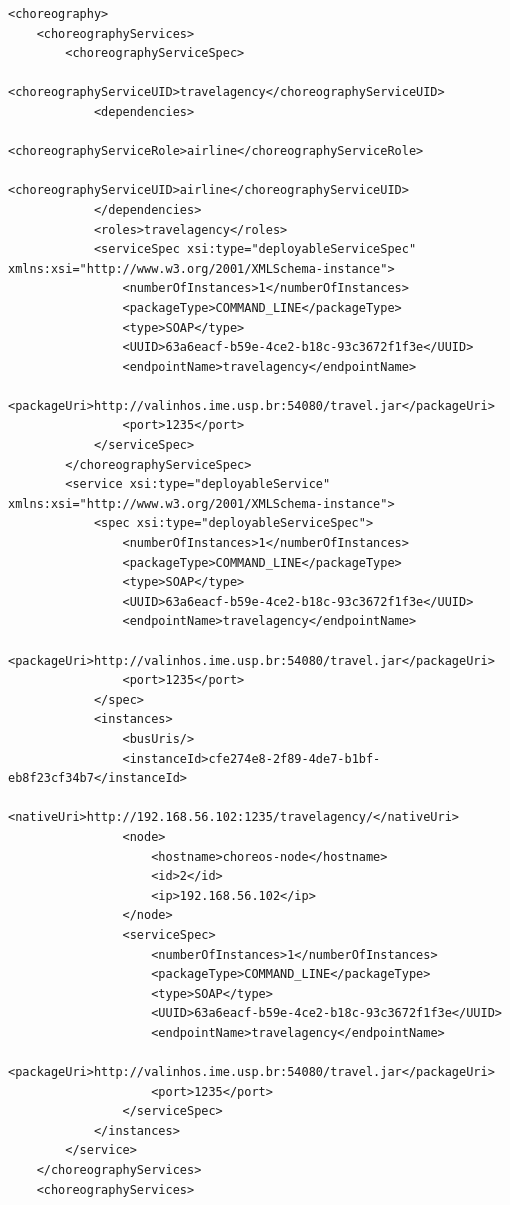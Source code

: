 \documentclass[a4paper, 10pt]{article}
\begin{document}
{\begin{lstlisting}[caption=Choreography XML representation example, label=lst:chor_xml]
<choreography>
    <choreographyServices>
        <choreographyServiceSpec>
            <choreographyServiceUID>travelagency</choreographyServiceUID>
            <dependencies>
                <choreographyServiceRole>airline</choreographyServiceRole>
                <choreographyServiceUID>airline</choreographyServiceUID>
            </dependencies>
            <roles>travelagency</roles>
            <serviceSpec xsi:type="deployableServiceSpec" 
xmlns:xsi="http://www.w3.org/2001/XMLSchema-instance">
                <numberOfInstances>1</numberOfInstances>
                <packageType>COMMAND_LINE</packageType>
                <type>SOAP</type>
                <UUID>63a6eacf-b59e-4ce2-b18c-93c3672f1f3e</UUID>
                <endpointName>travelagency</endpointName>
                <packageUri>http://valinhos.ime.usp.br:54080/travel.jar</packageUri>
                <port>1235</port>
            </serviceSpec>
        </choreographyServiceSpec>
        <service xsi:type="deployableService" 
xmlns:xsi="http://www.w3.org/2001/XMLSchema-instance">
            <spec xsi:type="deployableServiceSpec">
                <numberOfInstances>1</numberOfInstances>
                <packageType>COMMAND_LINE</packageType>
                <type>SOAP</type>
                <UUID>63a6eacf-b59e-4ce2-b18c-93c3672f1f3e</UUID>
                <endpointName>travelagency</endpointName>
                <packageUri>http://valinhos.ime.usp.br:54080/travel.jar</packageUri>
                <port>1235</port>
            </spec>
            <instances>
                <busUris/>
                <instanceId>cfe274e8-2f89-4de7-b1bf-eb8f23cf34b7</instanceId>
                <nativeUri>http://192.168.56.102:1235/travelagency/</nativeUri>
                <node>
                    <hostname>choreos-node</hostname>
                    <id>2</id>
                    <ip>192.168.56.102</ip>
                </node>
                <serviceSpec>
                    <numberOfInstances>1</numberOfInstances>
                    <packageType>COMMAND_LINE</packageType>
                    <type>SOAP</type>
                    <UUID>63a6eacf-b59e-4ce2-b18c-93c3672f1f3e</UUID>
                    <endpointName>travelagency</endpointName>
                    <packageUri>http://valinhos.ime.usp.br:54080/travel.jar</packageUri>
                    <port>1235</port>
                </serviceSpec>
            </instances>
        </service>
    </choreographyServices>
    <choreographyServices>

\end{lstlisting}}
\end{document}
